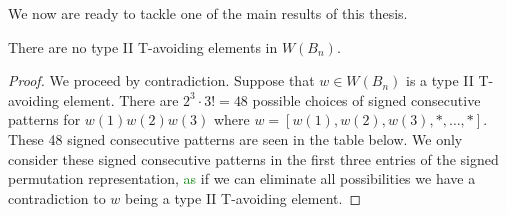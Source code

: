 We now are ready to tackle one of the main results of this thesis.

\begin{theorem}\label{thm:classificationofB}
There are no type II T-avoiding elements in $W(B_n)$.	


\begin{proof}
We proceed by contradiction. Suppose that $w \in W(B_n)$ is a type II T-avoiding element. There are $2^3 \cdot 3!=48$ possible choices of signed consecutive patterns for $w(1)w(2)w(3)$ where $w=[w(1), w(2), w(3), \ast, \ldots, \ast]$. These 48 signed consecutive patterns are seen in the table below. We only consider these signed consecutive patterns in the first three entries of the signed permutation representation, \textcolor{green}{as} if we can eliminate all possibilities we have a contradiction to $w$ being a type II T-avoiding element.


\end{proof}
\end{theorem}
